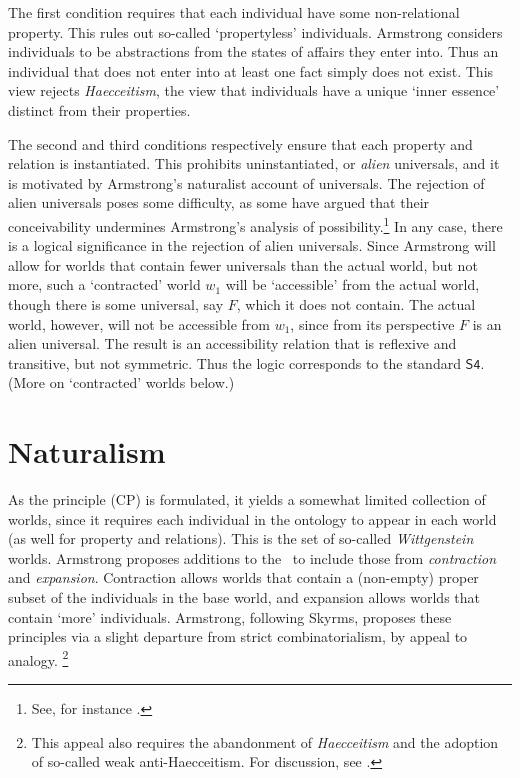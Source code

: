 The first condition requires that each individual have some non-relational property. This rules out so-called `propertyless' individuals. Armstrong considers individuals to be abstractions from the states of affairs they enter into. Thus an individual that does not enter into at least one fact simply does not exist. This view rejects \emph{Haecceitism}, the view that individuals have a unique `inner essence' distinct from their properties.

The second and third conditions respectively ensure that each property and relation is instantiated. This prohibits uninstantiated, or \emph{alien} universals, and it is motivated by Armstrong's naturalist account of universals. The rejection of alien universals poses some difficulty, as some have argued that their conceivability undermines Armstrong's analysis of possibility.\footnote{See, for instance \cite{Schneider:01}.} In any case, there is a logical significance in the rejection of alien universals. Since Armstrong will allow for worlds that contain fewer universals than the actual world, but not more, such a `contracted' world $w_1$ will be `accessible' from the actual world, though there is some universal, say $F$, which it does not contain. The actual world, however, will not be accessible from $w_1$, since from its perspective $F$ is an alien universal. The result is an accessibility relation that is reflexive and transitive, but not symmetric. Thus the logic corresponds to the standard $\mathsf{S4}$. (More on `contracted' worlds below.)


\section{Naturalism}\label{metaphysicalNecessity}
As the principle (CP) is formulated, it yields a somewhat limited collection of worlds, since it requires each individual in the ontology to appear in each world (as well for property and relations). This is the set of so-called \emph{Wittgenstein} worlds. Armstrong proposes additions to the \Worlds\ to include those from \emph{contraction} and \emph{expansion}. Contraction allows worlds that contain a (non-empty) proper subset of the individuals in the base world, and expansion allows worlds that contain `more' individuals. Armstrong, following Skyrms, proposes these principles via a slight departure from strict combinatorialism, by appeal to analogy. \footnote{This appeal also requires the abandonment of \emph{Haecceitism} and the adoption of so-called weak anti-Haecceitism. For discussion, see \cite[pp. 580-4]{Armstrong:86}  .}

